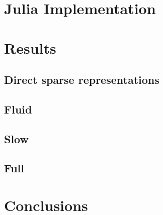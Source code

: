 \documentclass[
]{article}
\begin{document}
\section{Julia Implementation}\label{julia-implementation}

\section{Results}\label{results}

\subsection{Direct sparse
representations}\label{direct-sparse-representations}

\subsection{Fluid}\label{fluid}

\subsection{Slow}\label{slow}

\subsection{Full}\label{full}

\section{Conclusions}\label{conclusions}


\printbibliography
\end{document}
